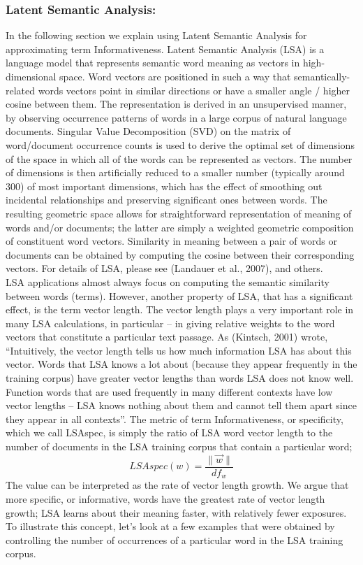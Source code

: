\subsubsection{Latent Semantic Analysis:}
In the following section we explain using Latent Semantic Analysis for approximating term Informativeness. Latent Semantic Analysis (LSA) is a language model that represents semantic word meaning as vectors in high-dimensional space. Word vectors are positioned in such a way that semantically-related words vectors point in similar directions or have a smaller angle / higher cosine between them. The representation is derived in an unsupervised manner, by observing occurrence patterns of words in a large corpus of natural language documents. Singular Value Decomposition (SVD) on the matrix of word/document occurrence counts is used to derive the optimal set of dimensions of the space in which all of the words can be represented as vectors. The number of dimensions is then artificially reduced to a smaller number (typically around 300) of most important dimensions, which has the effect of smoothing out incidental relationships and preserving significant ones between words. The resulting geometric space allows for straightforward representation of meaning of words and/or documents; the latter are simply a weighted geometric composition of constituent word vectors. Similarity in meaning between a pair of words or documents can be obtained by computing the cosine between their corresponding vectors. For details of LSA, please see (Landauer et al., 2007), and others.\\
LSA applications almost always focus on computing the semantic similarity between words (terms). However, another property of LSA, that has a significant effect, is the term vector length. The vector length plays a very important role in many LSA calculations, in particular – in giving relative weights to the word vectors that constitute a particular text passage. As (Kintsch, 2001) wrote, “Intuitively, the vector length tells us how much information LSA has about this vector. Words that LSA knows a lot about (because they appear frequently in the training corpus) have greater vector lengths than words LSA does not know well. Function words that are used frequently in many different contexts have low vector lengths -- LSA knows nothing about them and cannot tell them apart since they appear in all contexts”.
The metric of term Informativeness, or specificity, which we call LSAspec, is simply the ratio of LSA word vector length to the number of documents in the LSA training corpus that contain a particular word;
\begin{equation}
LSAspec(w)=\frac{\| \overrightarrow{w}\|}{df_w}
\end{equation}
The value can be interpreted as the rate of vector length growth. We argue that more specific, or informative, words have the greatest rate of vector length growth; LSA learns about their meaning faster, with relatively fewer exposures. To illustrate this concept, let's look at a few examples that were obtained by controlling the number of occurrences of a particular word in the LSA training corpus. \\

